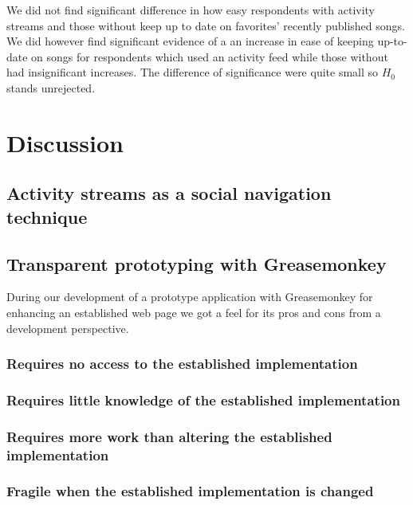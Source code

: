 We did not find significant difference in how easy respondents
with activity streams and those without keep up to date on favorites'
recently published songs. We did however find significant evidence
of a an increase in ease of keeping up-to-date on songs for respondents
which used an activity feed while those without had insignificant
increases. The difference of significance were quite small so $H_0$
stands unrejected.



\clearpage
\clearpage

\section{Discussion}

\subsection{Activity streams as a social navigation technique}

\subsection{Transparent prototyping with Greasemonkey}

During our development of a prototype application with Greasemonkey for
enhancing an established web page we got a feel for its pros and cons from a
development perspective.

\subsubsection{Requires no access to the established implementation}

\subsubsection{Requires little knowledge of the established implementation}

\subsubsection{Requires more work than altering the established
  implementation}

\subsubsection{Fragile when the established implementation is changed}


